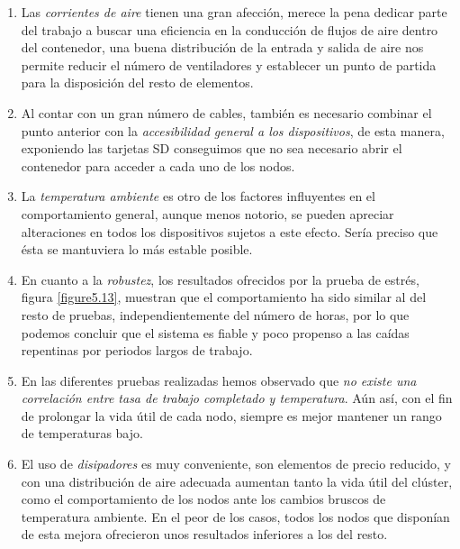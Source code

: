 \begin{enumerate}

\item Las \textit{corrientes de aire} tienen una gran afección, merece la pena dedicar parte del trabajo a buscar una eficiencia en la conducción de flujos de aire dentro del contenedor, una buena distribución de la entrada y salida de aire nos permite reducir el número de ventiladores y establecer un punto de partida para la disposición del resto de elementos.

\item Al contar con un gran número de cables, también es necesario combinar el punto anterior con la \textit{accesibilidad general a los dispositivos}, de esta manera, exponiendo las tarjetas SD conseguimos que no sea necesario abrir el contenedor para acceder a cada uno de los nodos.

\item La \textit{temperatura ambiente} es otro de los factores influyentes en el comportamiento general, aunque menos notorio, se pueden apreciar alteraciones en todos los dispositivos sujetos a este efecto. Sería preciso que ésta se mantuviera lo más estable posible.

\item En cuanto a la \textit{robustez}, los resultados ofrecidos por la prueba de estrés, figura \ref{figure5.13}, muestran que el comportamiento ha sido similar al del resto de pruebas, independientemente del número de horas, por lo que podemos concluir que el sistema es fiable y poco propenso a las caídas repentinas por periodos largos de trabajo.

\item En las diferentes pruebas realizadas hemos observado que \textit{no existe una correlación entre tasa de trabajo completado y temperatura}. Aún así, con el fin de prolongar la vida útil de cada nodo, siempre es mejor mantener un rango de temperaturas bajo.

\item El uso de \textit{disipadores} es muy conveniente, son elementos de precio reducido, y con una distribución de aire adecuada aumentan tanto la vida útil del clúster, como el comportamiento de los nodos ante los cambios bruscos de temperatura ambiente. En el peor de los casos, todos los nodos que disponían de esta mejora ofrecieron unos resultados inferiores a los del resto.

\end{enumerate}
